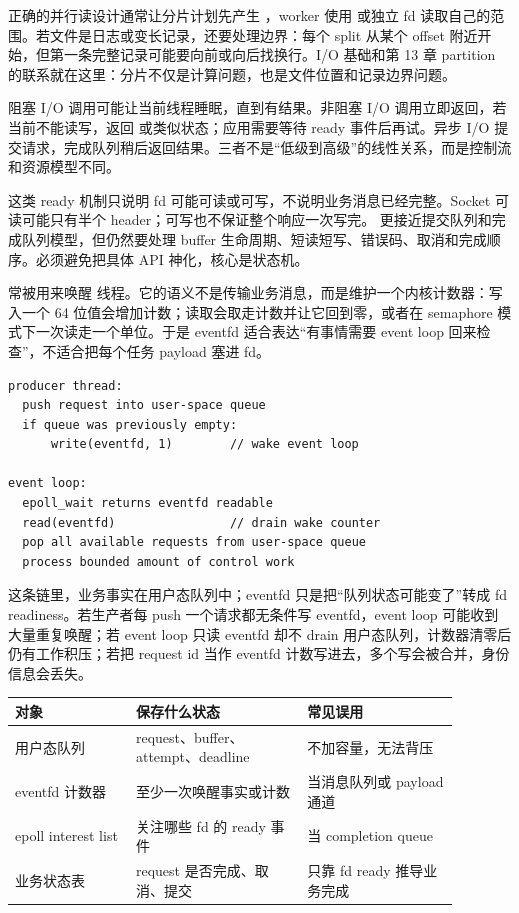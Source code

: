 正确的并行读设计通常让分片计划先产生 ，worker 使用  或独立 fd 读取自己的范围。若文件是日志或变长记录，还要处理边界：每个 split 从某个 offset 附近开始，但第一条完整记录可能要向前或向后找换行。I/O 基础和第 13 章 partition 的联系就在这里：分片不仅是计算问题，也是文件位置和记录边界问题。

阻塞 I/O 调用可能让当前线程睡眠，直到有结果。非阻塞 I/O 调用立即返回，若当前不能读写，返回  或类似状态；应用需要等待 ready 事件后再试。异步 I/O 提交请求，完成队列稍后返回结果。三者不是“低级到高级”的线性关系，而是控制流和资源模型不同。

 这类 ready 机制只说明 fd 可能可读或可写，不说明业务消息已经完整。Socket 可读可能只有半个 header；可写也不保证整个响应一次写完。 更接近提交队列和完成队列模型，但仍然要处理 buffer 生命周期、短读短写、错误码、取消和完成顺序。必须避免把具体 API 神化，核心是状态机。

 常被用来唤醒  线程。它的语义不是传输业务消息，而是维护一个内核计数器：写入一个 64 位值会增加计数；读取会取走计数并让它回到零，或者在 semaphore 模式下一次读走一个单位。于是 eventfd 适合表达“有事情需要 event loop 回来检查”，不适合把每个任务 payload 塞进 fd。

\begin{lstlisting}[numbers=none,caption={eventfd 唤醒的正确分层}]
producer thread:
  push request into user-space queue
  if queue was previously empty:
      write(eventfd, 1)        // wake event loop

event loop:
  epoll_wait returns eventfd readable
  read(eventfd)                // drain wake counter
  pop all available requests from user-space queue
  process bounded amount of control work
\end{lstlisting}

这条链里，业务事实在用户态队列中；eventfd 只是把“队列状态可能变了”转成 fd readiness。若生产者每 push 一个请求都无条件写 eventfd，event loop 可能收到大量重复唤醒；若 event loop 只读 eventfd 却不 drain 用户态队列，计数器清零后仍有工作积压；若把 request id 当作 eventfd 计数写进去，多个写会被合并，身份信息会丢失。

\begin{center}
\small
\begin{tabular}{p{0.24\linewidth}p{0.34\linewidth}p{0.30\linewidth}}
\toprule
对象 & 保存什么状态 & 常见误用 \\
\midrule
用户态队列 & request、buffer、attempt、deadline & 不加容量，无法背压 \\
eventfd 计数器 & 至少一次唤醒事实或计数 & 当消息队列或 payload 通道 \\
epoll interest list & 关注哪些 fd 的 ready 事件 & 当 completion queue \\
业务状态表 & request 是否完成、取消、提交 & 只靠 fd ready 推导业务完成 \\
\bottomrule
\end{tabular}
\end{center}

